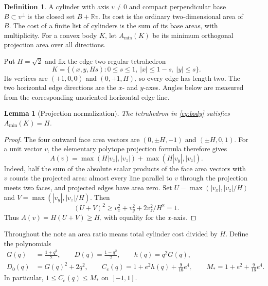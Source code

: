 \documentclass[11pt]{amsart}
\newtheorem{lemma}[theorem]{Lemma}
\theoremstyle{definition}
\newtheorem{definition}[theorem]{Definition}
\theoremstyle{remark}
\newcommand{\R}{\mathbb R}
\newcommand{\Amin}{A_{\min}}
\begin{document}
\begin{definition}
A cylinder with axis $v\ne0$ and compact perpendicular base $B\subset v^\perp$
is the closed set $B+\R v$. Its cost is the ordinary two-dimensional area
of $B$. The cost of a finite list of cylinders is the sum of its base
areas, with multiplicity. For a convex body $K$, let $\Amin(K)$ be its
minimum orthogonal projection area over all directions.
\end{definition}

Put $H=\sqrt2$ and fix the edge-two regular tetrahedron
\begin{equation}\label{eq:body}
 K=\{(x,y,Hs):0\le s\le1,\ |x|\le1-s,\ |y|\le s\}.
\end{equation}
Its vertices are $(\pm1,0,0)$ and $(0,\pm1,H)$, so every edge has
length two. The two horizontal edge directions are the $x$- and
$y$-axes. Angles below are measured from the corresponding unoriented
horizontal edge line.

\begin{lemma}[Projection normalization]\label{lem:normalization}
The tetrahedron in \eqref{eq:body} satisfies $\Amin(K)=H$.
\end{lemma}
\begin{proof}
The four outward face area vectors are $(0,\pm H,-1)$ and
$(\pm H,0,1)$. For a unit vector $v$, the elementary polytope projection
formula therefore gives
\[
 A(v)=\max(H|v_x|,|v_z|)+\max(H|v_y|,|v_z|).
\]
Indeed, half the sum of the absolute scalar products of the face area
vectors with $v$ counts the projected area: almost every line parallel to
$v$ through the projection meets two faces, and projected edges have area
zero. Set $U=\max(|v_x|,|v_z|/H)$ and
$V=\max(|v_y|,|v_z|/H)$. Then
\[
 (U+V)^2\ge v_x^2+v_y^2+2v_z^2/H^2=1.
\]
Thus $A(v)=H(U+V)\ge H$, with equality for the $x$-axis.
\end{proof}

Throughout the note an area ratio means total cylinder cost divided by
$H$. Define the polynomials
\begin{equation}\label{eq:polynomials}
\begin{split}
 G(q)&=\frac{1+q^2}{2},\qquad D(q)=\frac{1-q^2}{2},
 \qquad h(q)=q^2G(q),\\
 D_0(q)&=G(q)^2+2q^2,\qquad
 C_e(q)=1+e^2h(q)+\frac9{16}e^4,
 \qquad M_*=1+e^2+\frac9{16}e^4.
\end{split}
\end{equation}
In particular, $1\le C_e(q)\le M_*$ on $[-1,1]$.
\end{document}
